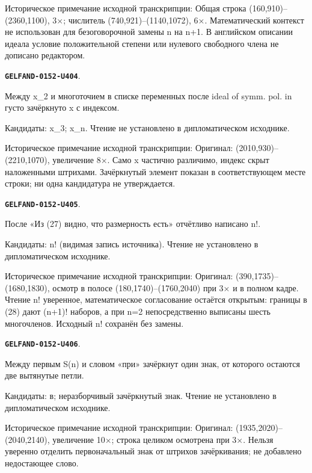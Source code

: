 \documentclass[11pt]{article}
\theoremstyle{definition}
\theoremstyle{remark}
\begin{document}
Историческое примечание исходной транскрипции: Общая строка (160,910)–(2360,1100), 3×; числитель (740,921)–(1140,1072), 6×. Математический контекст не использован для безоговорочной замены n на n+1. В английском описании идеала условие положительной степени или нулевого свободного члена не дописано редактором.\par\medskip
\par\noindent\leavevmode{}\label{GELFAND-0152-U404}\label{GELFAND-P001404:finite26-cancelled:note}\textbf{\texttt{GELFAND-0152-U404}}.\nopagebreak[4]\par
Между x\_2 и многоточием в списке переменных после ideal of symm. pol. in густо зачёркнуто x с индексом.\par
Кандидаты: x\_3; x\_n. Чтение не установлено в дипломатическом исходнике.\par
Историческое примечание исходной транскрипции: Оригинал: (2010,930)–(2210,1070), увеличение 8×. Само x частично различимо, индекс скрыт наложенными штрихами. Зачёркнутый элемент показан в соответствующем месте строки; ни одна кандидатура не утверждается.\par\medskip
\par\noindent\leavevmode{}\label{GELFAND-0152-U405}\label{GELFAND-P001404:dimension-factorial:note}\textbf{\texttt{GELFAND-0152-U405}}.\nopagebreak[4]\par
После «Из (27) видно, что размерность есть» отчётливо написано n!.\par
Кандидаты: n! (видимая запись источника). Чтение не установлено в дипломатическом исходнике.\par
Историческое примечание исходной транскрипции: Оригинал: (390,1735)–(1680,1830), осмотр в полосе (180,1740)–(1760,2040) при 3× и в полном кадре. Чтение n! уверенное, математическое согласование остаётся открытым: границы в (28) дают (n+1)! наборов, а при n=2 непосредственно выписаны шесть многочленов. Исходный n! сохранён без замены.\par\medskip
\par\noindent\leavevmode{}\label{GELFAND-0152-U406}\label{GELFAND-P001404:question30-cancelled:note}\textbf{\texttt{GELFAND-0152-U406}}.\nopagebreak[4]\par
Между первым S(n) и словом «при» зачёркнут один знак, от которого остаются две вытянутые петли.\par
Кандидаты: в; неразборчивый зачёркнутый знак. Чтение не установлено в дипломатическом исходнике.\par
Историческое примечание исходной транскрипции: Оригинал: (1935,2020)–(2040,2140), увеличение 10×; строка целиком осмотрена при 3×. Нельзя уверенно отделить первоначальный знак от штрихов зачёркивания; не добавлено недостающее слово.\par\medskip
\end{document}
